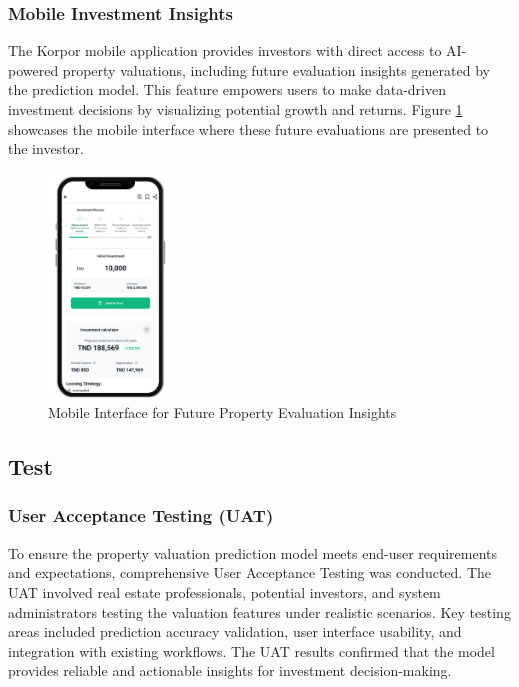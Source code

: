 \subsubsection{Mobile Investment Insights}
The Korpor mobile application provides investors with direct access to AI-powered property valuations, including future evaluation insights generated by the prediction model. This feature empowers users to make data-driven investment decisions by visualizing potential growth and returns. Figure \ref{fig:mobile-future-evaluation} showcases the mobile interface where these future evaluations are presented to the investor.
\newpage
\begin{figure}[htbp]
    \centering
    \includegraphics[width=0.3\textwidth]{images/mobile_future_evaluation.png} %
    \caption{Mobile Interface for Future Property Evaluation Insights}
    \label{fig:mobile-future-evaluation}
\end{figure}


\subsection{Test}
\subsubsection{User Acceptance Testing (UAT)}
To ensure the property valuation prediction model meets end-user requirements and expectations, comprehensive User Acceptance Testing was conducted. The UAT involved real estate professionals, potential investors, and system administrators testing the valuation features under realistic scenarios. Key testing areas included prediction accuracy validation, user interface usability, and integration with existing workflows. The UAT results confirmed that the model provides reliable and actionable insights for investment decision-making.

